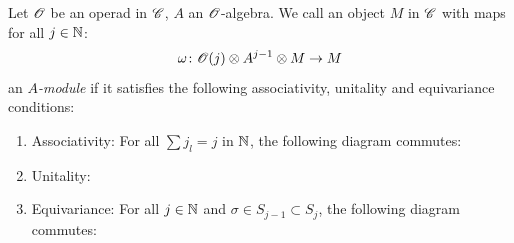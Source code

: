     \begin{defin}\label{module} Let $\mathscr{O}$ be an operad in $\mathscr{C}$, $A$ an
        $\mathscr{O}$-algebra. We call an object $M$ in $\mathscr{C}$ with maps for all $j \in
        \mathbb{N}$:
        \[
            \omega \colon \mathscr{O}(j) \otimes A^{j-1} \otimes M \rightarrow M 
        \]
        an $A${\em-module} if it satisfies the following associativity,
        unitality and equivariance conditions:
        \begin{enumerate}
            \item Associativity: For all $\sum j_l = j$ in $\mathbb{N}$, the following
            diagram commutes:
                \begin{center}
                \end{center}
                
            \item Unitality:
                \begin{center}
                \end{center}
        
            \item Equivariance: For all $j \in \mathbb{N}$ and $\sigma \in S_{j-1}
            \subset S_j$, the following diagram commutes:
                \begin{center}
                \end{center}
        \end{enumerate}
    \end{defin}


